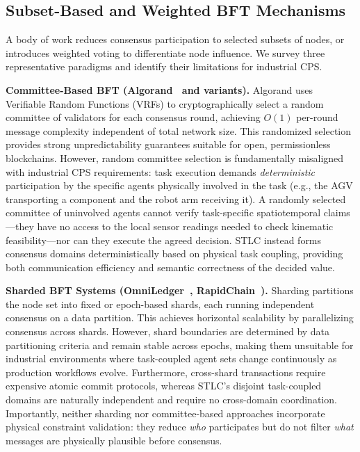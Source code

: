 \documentclass[manuscript,screen,review]{acmart}
\begin{document}
\subsection{Subset-Based and Weighted BFT Mechanisms}

A body of work reduces consensus participation to selected subsets of nodes, or introduces weighted voting to differentiate node influence. We survey three representative paradigms and identify their limitations for industrial CPS.

\textbf{Committee-Based BFT (Algorand~\cite{gilad2017algorand} and variants).} Algorand uses Verifiable Random Functions (VRFs) to cryptographically select a random committee of validators for each consensus round, achieving $O(1)$ per-round message complexity independent of total network size. This randomized selection provides strong unpredictability guarantees suitable for open, permissionless blockchains. However, random committee selection is fundamentally misaligned with industrial CPS requirements: task execution demands \textit{deterministic} participation by the specific agents physically involved in the task (e.g., the AGV transporting a component and the robot arm receiving it). A randomly selected committee of uninvolved agents cannot verify task-specific spatiotemporal claims---they have no access to the local sensor readings needed to check kinematic feasibility---nor can they execute the agreed decision. STLC instead forms consensus domains deterministically based on physical task coupling, providing both communication efficiency and semantic correctness of the decided value.

\textbf{Sharded BFT Systems (OmniLedger~\cite{kokoris2018omniledger}, RapidChain~\cite{zamani2018rapidchain}).} Sharding partitions the node set into fixed or epoch-based shards, each running independent consensus on a data partition. This achieves horizontal scalability by parallelizing consensus across shards. However, shard boundaries are determined by data partitioning criteria and remain stable across epochs, making them unsuitable for industrial environments where task-coupled agent sets change continuously as production workflows evolve. Furthermore, cross-shard transactions require expensive atomic commit protocols, whereas STLC's disjoint task-coupled domains are naturally independent and require no cross-domain coordination. Importantly, neither sharding nor committee-based approaches incorporate physical constraint validation: they reduce \textit{who} participates but do not filter \textit{what} messages are physically plausible before consensus.
\end{document}
